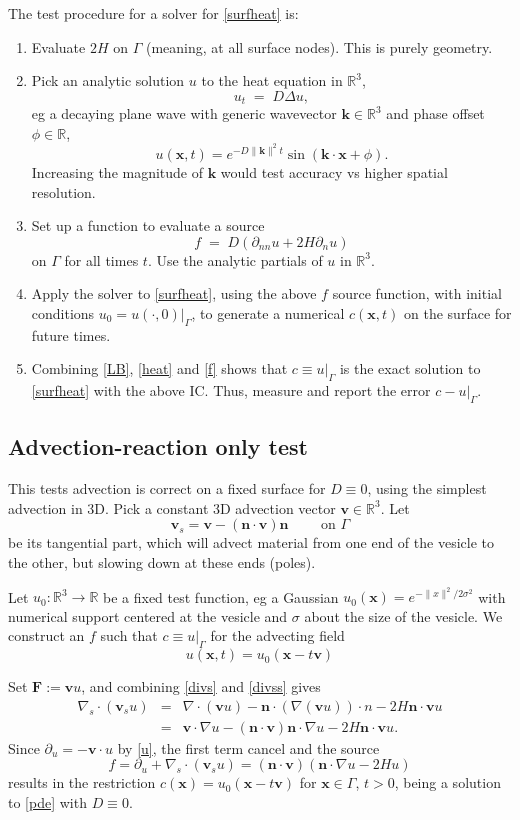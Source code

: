 \documentclass[11pt]{article}
\newcommand{\ben}{\begin{enumerate}}
\newcommand{\een}{\end{enumerate}}
\newcommand{\be}{\begin{equation}}
\newcommand{\ee}{\end{equation}}
\newcommand{\bea}{\begin{eqnarray}}
\newcommand{\eea}{\end{eqnarray}}
\newcommand{\mbf}[1]{{\mathbf #1}}
\newcommand{\R}{\mathbb{R}}
\newcommand{\x}{\mbf{x}}
\newcommand{\n}{\mbf{n}}
\newcommand{\kk}{\mbf{k}}
\newcommand{\vv}{\mbf{v}}
\begin{document}
The test procedure for a solver for \eqref{surfheat} is:
\ben
\item
  Evaluate $2H$ on $\Gamma$ (meaning, at all surface nodes). This
  is purely geometry.
\item Pick an analytic
  solution $u$ to the heat equation in $\R^3$,
  \be
  u_t \;=\;D \Delta u,
  \label{heat}
  \ee
  eg a decaying
  plane wave with generic wavevector $\kk\in\R^3$ and phase offset $\phi\in\R$,
  $$
  u(\x,t) = e^{-D\|\kk\|^2 t} \sin(\kk\cdot \x + \phi).
  $$
  Increasing the magnitude of $\kk$ would test accuracy vs higher spatial
  resolution.
\item
  Set up a function to evaluate a source
  \be
  f \;=\; D(\partial_{nn} u + 2H \partial_n u)
  \label{f}
  \ee
  on $\Gamma$ for all times $t$. Use the analytic partials of $u$ in $\R^3$.
\item
  Apply the solver to \eqref{surfheat}, using the above $f$ source function,
  with initial conditions $u_0 = u(\cdot,0)|_\Gamma$,
  to generate a numerical $c(\x,t)$ on the surface for future times.
\item
  Combining \eqref{LB}, \eqref{heat} and \eqref{f} shows that
  $c \equiv u|_\Gamma$ is the exact solution to \eqref{surfheat} with the above
  IC.
  Thus, measure and report the error $c - u|_\Gamma$.
\een

\subsection{Advection-reaction only test}

This tests advection is correct on a fixed surface for $D\equiv 0$,
using the simplest advection in 3D.
Pick a constant 3D advection vector $\vv\in\R^3$.
Let
$$
\vv_s = \vv - (\n\cdot\vv)\n  \qquad \mbox{ on } \Gamma
$$
be its tangential part, which will advect material
from one end of the vesicle to the other, but slowing down at these ends (poles).

Let $u_0:\R^3\to\R$ be a fixed test function, eg a Gaussian
$u_0(\x) = e^{-\|x\|^2/2\sigma^2}$ with numerical support centered at the vesicle
and $\sigma$ about the size of the vesicle.
We construct an $f$ such that $c \equiv u|_\Gamma$ for the advecting
field
\be
u(\x,t) = u_0(\x - t\vv)
\label{u}
\ee

Set $\mbf{F} := \vv u$, and combining \eqref{divs} and \eqref{divss}
gives
\bea
\nabla_s\cdot(\vv_s u) &=& \nabla\cdot (\vv u) - \n\cdot (\nabla(\vv u)) \cdot n
- 2H \n \cdot\vv u
\nonumber\\
&=& \vv \cdot \nabla u - (\n\cdot\vv) \n\cdot \nabla u - 2H \n \cdot \vv u.
\eea
Since $\partial_u = -\vv\cdot u$ by \eqref{u}, the first term cancel
and the source
\be
f = \partial_u + \nabla_s\cdot(\vv_s u) = (\n\cdot\vv)(\n\cdot \nabla u - 2H u)
\label{fadv}
\ee
results in the restriction
$c(\x) = u_0(\x-t\vv)$ for $\x\in\Gamma$, $t>0$, being a
solution to \eqref{pde} with $D\equiv 0$.
\end{document}
